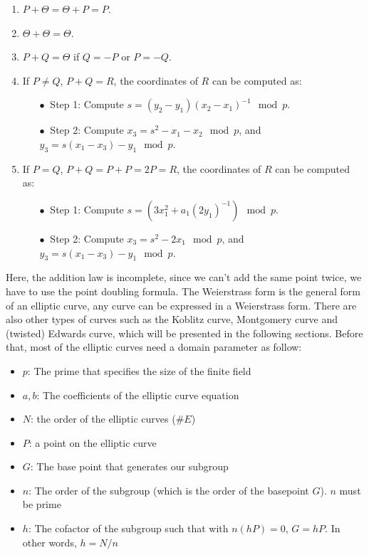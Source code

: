 \begin{enumerate}
  \item $P + \Theta = \Theta + P = P$.
  \item $\Theta + \Theta = \Theta$.
  \item $P + Q = \Theta$ if $Q = -P$ or $P = -Q$.
  \item If $P \neq Q$, $P + Q = R$, the coordinates of $R$ can be computed as:

        \begin{itemize}
        \addtolength{\itemindent}{1cm}
          \item[$\bullet \ $ Step 1:] Compute $s = (y_2 - y_1) (x_2 - x_1)^{-1} \mod p$.
          \item[$\bullet \ $ Step 2:] Compute $x_3 = s^2 - x_1 - x_2 \mod p$, and $y_3 = s(x_1 - x_3) - y_1 \mod p$.
        \end{itemize}

  \item If $P = Q$, $P + Q = P + P = 2P = R$, the coordinates of $R$ can be computed as:

        \begin{itemize}
        \addtolength{\itemindent}{1cm}
          \item[$\bullet \ $ Step 1:] Compute $s = (3x_1^2 + a_1 (2y_1)^{-1}) \mod p$.
          \item[$\bullet \ $ Step 2:] Compute $x_3 = s^2 - 2x_1 \mod p$, and $y_3 = s(x_1 - x_3) - y_1 \mod p$.
        \end{itemize}

\end{enumerate}

Here, the addition law is incomplete, since we can’t add the same point twice, we have to use the point doubling formula. The Weierstrass form is the general form of an elliptic curve, any curve can be expressed in a Weierstrass form. There are also other types of curves such as the Koblitz curve, Montgomery curve and (twisted) Edwards curve, which will be presented in the following sections. Before that, most of the elliptic curves need a domain parameter as follow:

\begin{itemize}
  \item$p$: The prime that specifies the size of the finite field
  \item$a, b$: The coefficients of the elliptic curve equation
  \item$N$: the order of the elliptic curves ($\#E$)
  \item $P$: a point on the elliptic curve
        \item$G$: The base point that generates our subgroup
        \item$n$: The order of the subgroup (which is the order of the basepoint $G$). $n$ must be prime
        \item$h$: The cofactor of the subgroup such that with $n(hP)=0$, $G = hP$. In other words, $h=N/n$
\end{itemize}

